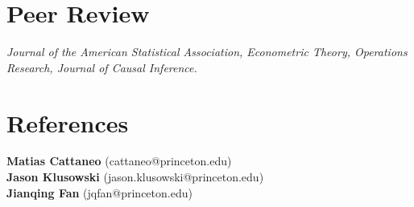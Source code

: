 \documentclass[10pt,a4paper,roman]{moderncv}        %
\begin{document}
\section{Peer Review}
\textit{
Journal of the American Statistical Association, Econometric Theory, Operations
Research, Journal of Causal Inference.
}

\section{References}
\textbf{Matias Cattaneo} (cattaneo@princeton.edu)\\
\textbf{Jason Klusowski} (jason.klusowski@princeton.edu)\\
\textbf{Jianqing Fan} (jqfan@princeton.edu)


\clearpage
\end{document}
